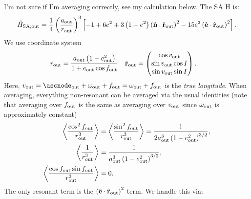 \documentclass[11pt,
        usenames, %
        dvipsnames %
    ]{article}
\newcommand*{\bm}[1]{\boldsymbol{\mathbf{#1}}}
\newcommand*{\uv}[1]{\hat{\bm{#1}}}
\newcommand*{\ev}[1]{\left\langle#1\right\rangle}
\newcommand*{\p}[1]{\left(#1\right)}
\newcommand*{\s}[1]{\left[#1\right]}
\begin{document}
I'm not sure if I'm averaging correctly, see my calculation below. The SA H is:
\begin{align}
    \tilde{H}_{\rm SA, out}
        = \frac{1}{4}\p{\frac{a_{\rm out}}{r_{\rm out}}}^3 \s{
            -1 + 6e^2 + 3\p{1 - e^2}\p{\uv{n} \cdot \uv{r}_{\rm out}}^2
            - 15 e^2\p{\uv{e} \cdot \uv{r}_{\rm out}}^2}.
\end{align}
We use coordinate system
\begin{align}
    r_{\rm out} &= \frac{a_{\rm out}\p{1 - e_{\rm out}^2}}{1 + e_{\rm out} \cos
        f_{\rm out}} &
    \uv{r}_{\rm out} &= \begin{pmatrix}
        \cos v_{\rm out}\\
        \sin v_{\rm out} \cos I\\
        \sin v_{\rm out} \sin I
    \end{pmatrix}.
\end{align}
Here, $v_{\rm out} = \ascnode_{\rm out} + \omega_{\rm out} + f_{\rm out} =
\omega_{\rm out} + f_{\rm out}$ is the \emph{true longitude}. When averaging,
everything non-resonant can be averaged via the usual identities (note that
averaging over $f_{\rm out}$ is the same as averaging over $v_{\rm out}$ since
$\omega_{\rm out}$ is approximately constant)
\begin{align}
    \ev{\frac{\cos^2 f_{\rm out}}{r_{\rm out}^3}} &=
        \ev{\frac{\sin^2 f_{\rm out}}{r_{\rm out}^3}}
        = \frac{1}{2a_{\rm out}^3\p{1 - e_{\rm out}^2}^{3/2}},\\
    \ev{\frac{1}{r_{\rm out}^3}} &= \frac{1}{a_{\rm out}^3\p{1 - e_{\rm
        out}^2}^{3/2}},\\
    \ev{\frac{\cos f_{\rm out} \sin f_{\rm out}}{r_{\rm out}^3}} &= 0.
\end{align}
The only resonant term is the $\p{\uv{e} \cdot \uv{r}_{\rm out}}^2$ term. We
handle this via:
\end{document}
